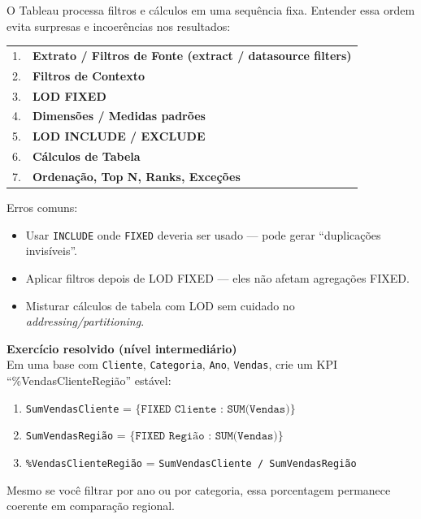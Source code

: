 O Tableau processa filtros e cálculos em uma sequência fixa. Entender essa ordem evita surpresas e incoerências nos resultados:

\begin{center}
\begin{tabular}{ll}
1. & \textbf{Extrato / Filtros de Fonte (extract / datasource filters)} \\
2. & \textbf{Filtros de Contexto} \\
3. & \textbf{LOD FIXED} \\
4. & \textbf{Dimensões / Medidas padrões} \\
5. & \textbf{LOD INCLUDE / EXCLUDE} \\
6. & \textbf{Cálculos de Tabela} \\
7. & \textbf{Ordenação, Top N, Ranks, Exceções}
\end{tabular}
\end{center}

Erros comuns:
\begin{itemize}[leftmargin=*]
  \item Usar \texttt{INCLUDE} onde \texttt{FIXED} deveria ser usado — pode gerar “duplicações invisíveis”.  
  \item Aplicar filtros depois de LOD FIXED — eles não afetam agregações FIXED.  
  \item Misturar cálculos de tabela com LOD sem cuidado no \textit{addressing/partitioning}.
\end{itemize}

\begin{SolvedBox}
\textbf{Exercício resolvido (nível intermediário)}\\[-3pt]
Em uma base com \texttt{Cliente}, \texttt{Categoria}, \texttt{Ano}, \texttt{Vendas}, crie um KPI “\%VendasClienteRegião” estável:

\begin{enumerate}[leftmargin=*]
  \item \texttt{SumVendasCliente} = \(\{ \texttt{FIXED Cliente : SUM(Vendas)}\}\)  
  \item \texttt{SumVendasRegião} = \(\{ \texttt{FIXED Região : SUM(Vendas)}\}\)  
  \item \texttt{\%VendasClienteRegião} = \texttt{SumVendasCliente / SumVendasRegião}  
\end{enumerate}

Mesmo se você filtrar por ano ou por categoria, essa porcentagem permanece coerente em comparação regional.
\end{SolvedBox}


